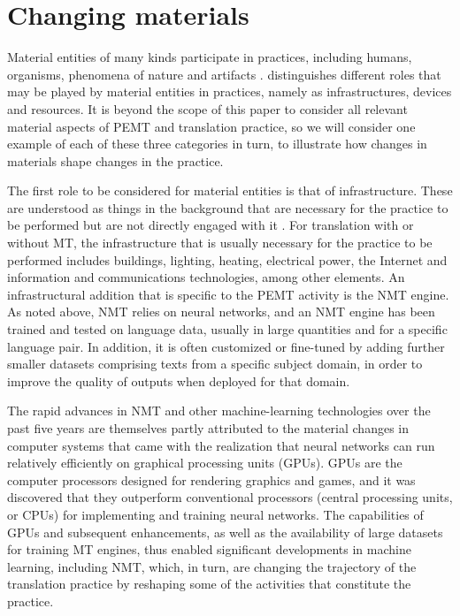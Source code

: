 \documentclass[output=paper,colorlinks,citecolor=brown]{langsci/langscibook}
\begin{document}
\section{Changing materials}

Material entities of many kinds participate in practices, including humans, organisms, phenomena of nature and artifacts \citep[39]{schatzki_social_2019}. \citet{shove_matters_2017} distinguishes different roles that may be played by material entities in practices, namely as infrastructures, devices and resources. It is beyond the scope of this paper to consider all relevant material aspects of PEMT and translation practice, so we will consider one example of each of these three categories in turn, to illustrate how changes in materials shape changes in the practice.

The first role to be considered for material entities is that of infrastructure. These are understood as things in the background that are necessary for the practice to be performed but are not directly engaged with it \citep{shove_matters_2017}. For translation with or without MT, the infrastructure that is usually necessary for the practice to be performed includes buildings, lighting, heating, electrical power, the Internet and information and communications technologies, among other elements. An infrastructural addition that is specific to the PEMT activity is the NMT engine. As noted above, NMT relies on neural networks, and an NMT engine has been trained and tested on language data, usually in large quantities and for a specific language pair. In addition, it is often customized or fine-tuned by adding further smaller datasets comprising texts from a specific subject domain, in order to improve the quality of outputs when deployed for that domain. 

The rapid advances in NMT and other machine-learning technologies over the past five years are themselves partly attributed to the material changes in computer systems that came with the realization that neural networks can run relatively efficiently on graphical processing units (GPUs). GPUs are the computer processors designed for rendering graphics and games, and it was discovered that they outperform conventional processors (central processing units, or CPUs) for implementing and training neural networks. The capabilities of GPUs and subsequent enhancements, as well as the availability of large datasets for training MT engines, thus enabled significant developments in machine learning, including NMT, which, in turn, are changing the trajectory of the translation practice by reshaping some of the activities that constitute the practice. 
\end{document}
